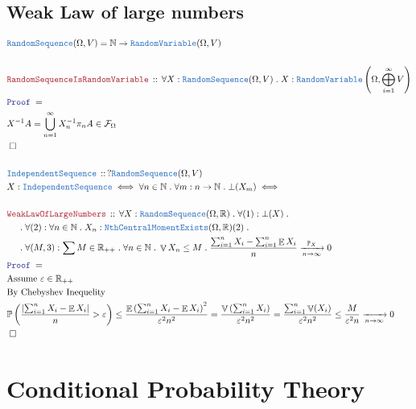\documentclass[12pt]{scrartcl}
\newcommand{\TYPE}[1]{\textcolor{NavyBlue}{\mathtt{#1}}}
\newcommand{\LOGIC}[1]{\textcolor{Blue}{\mathtt{#1}}}
\newcommand{\THM}[1]{\textcolor{Maroon}{\mathtt{#1}}}
\renewcommand{\.}{\; . \;}
\newcommand{\Theorem}[2]{& \THM{#1} \, :: \, #2 \\ & \Proof = \\ }
\newcommand{\DeclareType}[2]{& \TYPE{#1} \, :: \, #2 \\}
\newcommand{\DefineNamedType}[4]{& #1 : \TYPE{#2} \iff #3 \iff #4 \\}
\newcommand{\NewLine}{\\ & \kern 1pc}
\newcommand{\Page}[1]{\begin{align*} #1 \end{align*}   }
\newcommand{\Reals}{\mathbb{R} }
\newcommand{\Nat}{\mathbb{N} }
\newcommand{\QED}{\; \square}
\newcommand{\EndProof}{& \QED \\}
\newcommand{\Proof}{\LOGIC{Proof} \; }
\newcommand{\F}{\mathcal{F}}
\renewcommand{\O}{\Omega}
\renewcommand{\P}{\mathbb{P}}
\newcommand{\RV}{\TYPE{RandomVariable}}
\newcommand{\RS}{\TYPE{RandomSequence}}
\DeclareMathOperator*{\Exp}{\mathbb{E}}
\DeclareMathOperator*{\Var}{\mathbb{V}}
\begin{document}
\subsection{Weak Law of large numbers}
\Page{
	& \RS(\O,V) = \Nat \to \RV(\O,V) \\
	\\
	\Theorem{RandomSequenceIsRandomVariable}{\forall X : \RS(\O,V) \. X : \RV\left(\O, \bigoplus^\infty_{i=1} V  \right) }
	&  X^{-1} A =  \bigcup^\infty_{n = 1} X_n^{-1} \pi_n A \in \F_\O \\
	\EndProof
	\\
	\DeclareType{IndependentSequence}{? \RS(\O,V)}
	\DefineNamedType{X}{IndependentSequence}{\forall n \in \Nat \. \forall m : n \to \Nat \. \bot(X_m)}
	\\
	\Theorem{WeakLawOfLargeNumbers}{
		\forall X : \RS(\O,\Reals) \. 
		\forall (1) : \bot(X) \. 
		\NewLine \.
		\forall (2) : \forall n \in \Nat \. X_n : \TYPE{NthCentralMomentExists}(\O,\Reals)(2) \. 
		\NewLine \.
		\forall (M,3) : \sum M \in \Reals_{++} \. \forall n \in \Nat \. \Var X_n \le M \.
		\frac{\sum^n_{i=1} X_i - \sum^n_{i=1} \Exp X_i }{n} \xrightarrow[n \to \infty]{\P_X} 0
	} 
	& \textrm{Assume $\varepsilon \in \Reals_{++}$} \\
	& \textrm{By Chebyshev Inequelity} \\ 
	& \P\left( \frac{\left| \sum^n_{i=1} X_i -  \Exp X_i \right|}{n} > \varepsilon    \right) \le \frac{\Exp \left( \sum^n_{i=1} X_i - \Exp X_i  \right)^2}{\varepsilon^2 n^2} = 
	   \frac{\Var\left( \sum^n_{i=1} X_i \right)}{\varepsilon^2 n^2} = \frac{\sum^n_{i=1} \Var(X_i)}{\varepsilon^2 n^2} \le  
	  \frac{M}{\varepsilon^2 n} \xrightarrow[n \to \infty]{} 0 \\
	\EndProof
}
\newpage
\section{Conditional Probability Theory}
\end{document}
